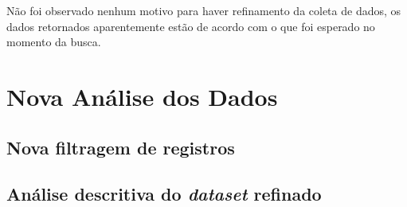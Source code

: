 Não foi observado nenhum motivo para haver refinamento da coleta de dados, os dados retornados aparentemente estão de acordo com o que foi esperado no momento da busca.

\section{Nova Análise dos Dados}

\subsection{Nova filtragem de registros}

\subsection{Análise descritiva do \textit{dataset} refinado}